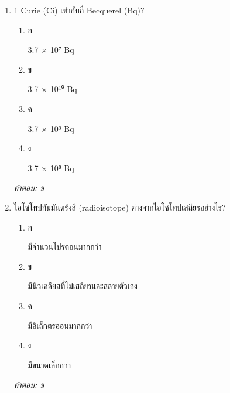 \documentclass[12pt]{article}
\begin{document}
\begin{enumerate}[label=\arabic*., itemsep=0.5\baselineskip, topsep=0.5\baselineskip, leftmargin=*]
\item 1 Curie (Ci) เท่ากับกี่ Becquerel (Bq)?
\begin{enumerate}[label=\alph*)., itemsep=0.3\baselineskip, topsep=0.3\baselineskip]
\item ก\ 
\begin{minipage}[t]{0.9\linewidth}
\raggedright 3.7 × 10⁷ Bq
\end{minipage}
\item ข\ 
\begin{minipage}[t]{0.9\linewidth}
\raggedright 3.7 × 10¹⁰ Bq
\end{minipage}
\item ค\ 
\begin{minipage}[t]{0.9\linewidth}
\raggedright 3.7 × 10⁹ Bq
\end{minipage}
\item ง\ 
\begin{minipage}[t]{0.9\linewidth}
\raggedright 3.7 × 10⁸ Bq
\end{minipage}
\end{enumerate}
\vspace{-0.3\baselineskip}
\begin{small}
\textit{คำตอบ: ข}
\end{small}

\item ไอโซโทปกัมมันตรังสี (radioisotope) ต่างจากไอโซโทปเสถียรอย่างไร?
\begin{enumerate}[label=\alph*)., itemsep=0.3\baselineskip, topsep=0.3\baselineskip]
\item ก\ 
\begin{minipage}[t]{0.9\linewidth}
\raggedright มีจำนวนโปรตอนมากกว่า
\end{minipage}
\item ข\ 
\begin{minipage}[t]{0.9\linewidth}
\raggedright มีนิวเคลียสที่ไม่เสถียรและสลายตัวเอง
\end{minipage}
\item ค\ 
\begin{minipage}[t]{0.9\linewidth}
\raggedright มีอิเล็กตรออนมากกว่า
\end{minipage}
\item ง\ 
\begin{minipage}[t]{0.9\linewidth}
\raggedright มีขนาดเล็กกว่า
\end{minipage}
\end{enumerate}
\vspace{-0.3\baselineskip}
\begin{small}
\textit{คำตอบ: ข}
\end{small}


\end{enumerate}
\end{document}
